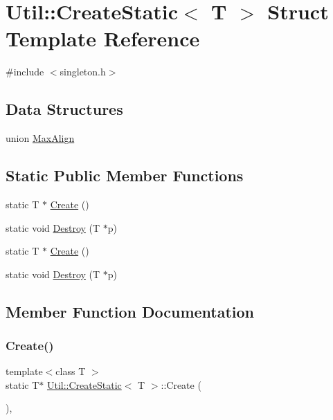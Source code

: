 \hypertarget{structUtil_1_1CreateStatic}{}\section{Util\+:\+:Create\+Static$<$ T $>$ Struct Template Reference}
\label{structUtil_1_1CreateStatic}


{\ttfamily \#include $<$singleton.\+h$>$}

\subsection*{Data Structures}
\begin{DoxyCompactItemize}
\item 
union \mbox{\hyperlink{unionUtil_1_1CreateStatic_1_1MaxAlign}{Max\+Align}}
\end{DoxyCompactItemize}
\subsection*{Static Public Member Functions}
\begin{DoxyCompactItemize}
\item 
static T $\ast$ \mbox{\hyperlink{structUtil_1_1CreateStatic_ab48b58ee24bd7bb78e5a66753c392e25}{Create}} ()
\item 
static void \mbox{\hyperlink{structUtil_1_1CreateStatic_af2da85deb7e0c886a06e74f3f1ac6fd7}{Destroy}} (T $\ast$p)
\item 
static T $\ast$ \mbox{\hyperlink{structUtil_1_1CreateStatic_ab48b58ee24bd7bb78e5a66753c392e25}{Create}} ()
\item 
static void \mbox{\hyperlink{structUtil_1_1CreateStatic_af2da85deb7e0c886a06e74f3f1ac6fd7}{Destroy}} (T $\ast$p)
\end{DoxyCompactItemize}


\subsection{Member Function Documentation}
\mbox{\label{structUtil_1_1CreateStatic_ab48b58ee24bd7bb78e5a66753c392e25}} 
\subsubsection{\texorpdfstring{Create()}{Create()}\hspace{0.1cm}{\footnotesize\ttfamily [1/2]}}
{\footnotesize\ttfamily template$<$class T $>$ \\
static T$\ast$ \mbox{\hyperlink{structUtil_1_1CreateStatic}{Util\+::\+Create\+Static}}$<$ T $>$\+::Create (\begin{DoxyParamCaption}{ }\end{DoxyParamCaption})\hspace{0.3cm}{\ttfamily [inline]}, {\ttfamily [static]}}

